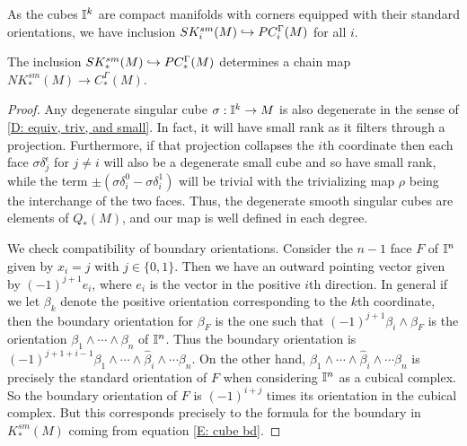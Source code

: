 As the cubes $\mathbb{I}^k$ are compact manifolds with corners equipped with their standard orientations,
 we have inclusion $SK^{sm}_i(M)\hookrightarrow PC_i^\Gamma(M)$ for all $i$.


\begin{lemma}
The inclusion $SK^{sm}_*(M)\hookrightarrow PC_*^\Gamma(M)$ determines a chain map $NK^{sm}_*(M) \to C_*^\Gamma(M)$.
\end{lemma}
\begin{proof}
Any degenerate singular cube $\sigma:\mathbb{I}^k \to M$ is also degenerate in the sense of \cref{D: equiv, triv, and small}. In fact, it will have small rank as it filters through a projection. Furthermore, if that projection collapses the $i$th coordinate then each face $\sigma \delta_j^\epsilon$ for $j\neq i$ will also be a degenerate small cube and so have small rank, while the term $\pm (\sigma \delta_i^0-\sigma \delta_i^1)$ will be trivial with the trivializing map $\rho$ being the interchange of the two faces. Thus, the degenerate smooth singular cubes are elements of $Q_*(M)$, and our map is well defined in each degree.

We check compatibility of boundary orientations. Consider the $n-1$ face $F$ of $\mathbb{I}^n$ given by $x_i = j$ with $j\in\{0,1\}$. Then we have an outward pointing vector given by $(-1)^{j+1}e_i$, where $e_i$ is the vector in the positive $i$th direction. In general if we let $\beta_k$ denote the positive orientation corresponding to the $k$th coordinate, then the boundary orientation for $\beta_F$ is the one such that
$(-1)^{j+1}\beta_i\wedge\beta_F$ is the orientation $\beta_1\wedge\cdots \wedge \beta_n$ of $\mathbb{I}^n$. Thus the boundary orientation is $(-1)^{j+1+i-1}\beta_1 \wedge \cdots \wedge \hat{\beta}_i \wedge \cdots\beta_n$. On the other hand, $\beta_1 \wedge \cdots \wedge \hat{\beta}_i \wedge \cdots\beta_n$ is precisely the standard orientation of $F$ when considering $\mathbb{I}^n$ as a cubical complex. So the boundary orientation of $F$ is $(-1)^{i+j}$ times its orientation in the cubical complex. But this corresponds precisely to the formula for the boundary in $K^{sm}_*(M)$ coming from equation \eqref{E: cube bd}.
\end{proof}

